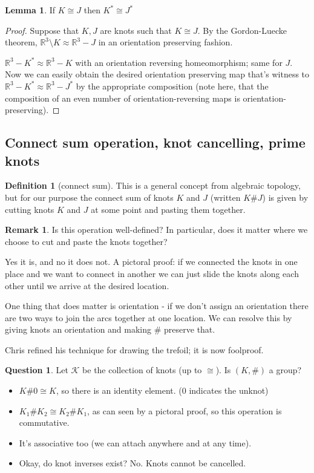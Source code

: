 \documentclass[11pt]{article}
\newcommand{\R}{\mathbb{R}}
\newcommand{\K}{\mathcal{K}}
\theoremstyle{plain}
\theoremstyle{definition}
\newtheorem{remark}{Remark}
\newtheorem{definition}{Definition}
\newtheorem{lemma}{Lemma}
\newtheorem{question}{Question}
\begin{document}
\begin{lemma}
  If $K \cong J$ then $K^\ast \cong J^\ast$
\end{lemma}

\begin{proof}
  Suppose that $K,J$ are knots such that $K \cong J$. By the Gordon-Luecke theorem, $\R^3 \setminus K \approx \R^3 - J$ in an orientation preserving fashion.

  $\R^3 - K^\ast \approx \R^3 - K$ with an orientation reversing homeomorphism; same for $J$. Now we can easily obtain the desired orientation preserving map that's witness to
  $\R^3 - K^\ast \approx \R^3 - J^\ast$ by the appropriate composition (note here, that the composition of an even number of orientation-reversing maps is orientation-preserving).
\end{proof}

\subsection{Connect sum operation, knot cancelling, prime knots}

\begin{definition}[connect sum]
  This is a general concept from algebraic topology, but for our purpose the connect sum of knots $K$ and $J$ (written $K\#J$) is given
  by cutting knots $K$ and $J$ at some point and pasting them together.
\end{definition}


\begin{remark}
  Is this operation well-defined? In particular, does it matter where we choose to cut and paste the knots together?


  Yes it is, and no it does not. A pictoral proof: if we connected the knots in one place and we want to connect in another we can just slide the knots along each other until we arrive at the desired location.

  One thing that does matter is orientation - if we don't assign an orientation there are two ways to join the arcs together at one location. We can resolve this by giving knots an orientation and making
  $\#$ preserve that.
\end{remark}

Chris refined his technique for drawing the trefoil; it is now foolproof.

\begin{question}
  Let $\K$ be the collection of knots (up to $\cong$). Is $(K, \#)$ a group?


  \begin{itemize}
  \item $K \# 0 \cong K$, so there is an identity element. ($0$ indicates the unknot)
  \item $K_1 \# K_2 \cong K_2 \# K_1$, as can seen by a pictoral proof, so this operation is commutative.
  \item It's associative too (we can attach anywhere and at any time).
  \item Okay, do knot inverses exist? No. Knots cannot be cancelled.
  \end{itemize}
\end{question}
\end{document}
